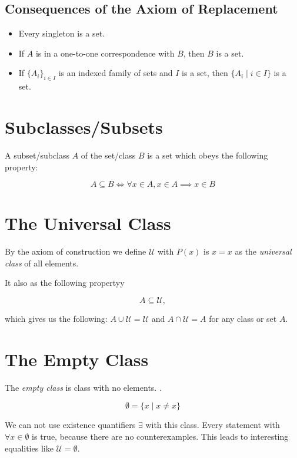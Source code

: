 \QED

\subsection{Consequences of the Axiom of Replacement}

\begin{itemize}

	\item Every singleton is a set.

	\item If \(A\) is in a one-to-one correspondence with \(B\), then \(B\) is a set.

	\item If \(\{A_i\}_{i \in I}\) is an indexed family of sets and \(I\) is a set, then \(\{A_i \mid i \in I\}\) is a set.

\end{itemize}

\section{Subclasses/Subsets}

A subset/subclass \(A\) of the set/class \(B\) is a set which obeys the following property:

\[
	A \subseteq B \iff \forall x \in A, x \in A \implies x \in B
\]

\section{The Universal Class}

By the axiom of construction we define \(\mathcal{U}\) with \(P(x)\) is \(x = x\) as the \emph{universal class} of all elements.

It also as the following propertyy

\[
	A \subseteq \mathcal{U},
\]

which gives us the following: \(A \cup \mathcal{U} = \mathcal{U}\) and \(A \cap \mathcal{U} = A\) for any class or set \(A\).

\section{The Empty Class}

The \emph{empty class} is class with no elements. .

\[
	\emptyset = \{x \mid x \neq x\}
\]

We can not use existence quantifiers \(\exists\) with this class.
Every statement with \(\forall x \in \emptyset\) is true, because there are no counterexamples.
This leads to interesting equalities like \(\mathcal{U} = \emptyset\).

